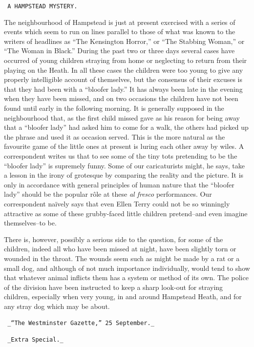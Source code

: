\documentclass[12pt,openright]{book}
\begin{document}
\texttt{                      A HAMPSTEAD MYSTERY.}

The neighbourhood of Hampstead is just at present exercised with a series of events which seem to run on lines parallel to those of what was known to the writers of headlines as “The Kensington Horror,” or “The Stabbing Woman,” or “The Woman in Black.” During the past two or three days several cases have occurred of young children straying from home or neglecting to return from their playing on the Heath. In all these cases the children were too young to give any properly intelligible account of themselves, but the consensus of their excuses is that they had been with a “bloofer lady.” It has always been late in the evening when they have been missed, and on two occasions the children have not been found until early in the following morning. It is generally supposed in the neighbourhood that, as the first child missed gave as his reason for being away that a “bloofer lady” had asked him to come for a walk, the others had picked up the phrase and used it as occasion served. This is the more natural as the favourite game of the little ones at present is luring each other away by wiles. A correspondent writes us that to see some of the tiny tots pretending to be the “bloofer lady” is supremely funny. Some of our caricaturists might, he says, take a lesson in the irony of grotesque by comparing the reality and the picture. It is only in accordance with general principles of human nature that the “bloofer lady” should be the popular rôle at these \textit{al fresco} performances. Our correspondent naïvely says that even Ellen Terry could not be so winningly attractive as some of these grubby-faced little children pretend–and even imagine themselves–to be.

There is, however, possibly a serious side to the question, for some of the children, indeed all who have been missed at night, have been slightly torn or wounded in the throat. The wounds seem such as might be made by a rat or a small dog, and although of not much importance individually, would tend to show that whatever animal inflicts them has a system or method of its own. The police of the division have been instructed to keep a sharp look-out for straying children, especially when very young, in and around Hampstead Heath, and for any stray dog which may be about.

\texttt{           \_“The Westminster Gazette,” 25 September.\_}

\texttt{                        \_Extra Special.\_}
\end{document}
